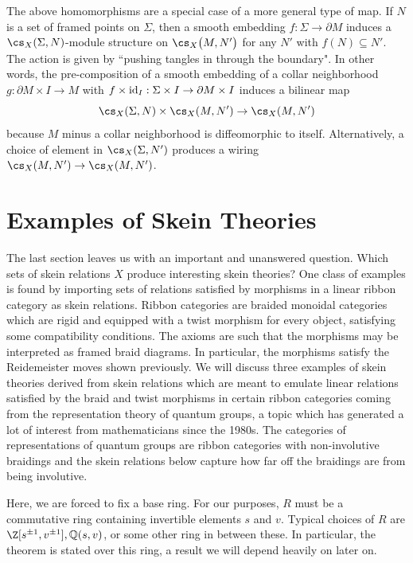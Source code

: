 \begin{remark} \label{rem:skeinaction}
The above homomorphisms are a special case of a more general type of map. If $N$ is a set of framed points on $\Sigma$, then a smooth embedding $f: \Sigma \to \partial M$ induces a $\cs_X(\Sigma, N)$-module structure on $\cs_X\big(M, N'\big)$ for any $N'$ with $f(N) \subseteq N'$. The action is given by ``pushing tangles in through the boundary". In other words, the pre-composition of a smooth embedding of a collar neighborhood $g: \partial M \times I \to M$ with $f \times {\rm{id}}_I: \Sigma\times I \to \partial M \times I$ induces a bilinear map
\[
\cs_X(\Sigma, N) \times \cs_X(M, N') \to \cs_X(M, N')
\]
because $M$ minus a collar neighborhood is diffeomorphic to itself. Alternatively, a choice of element in $\cs_X(\Sigma, N')$ produces a wiring $\cs_X(M, N') \to \cs_X(M, N')$.
\end{remark}


\section{Examples of Skein Theories} \label{sec:skeintheories}

The last section leaves us with an important and unanswered question. Which sets of skein relations $X$ produce interesting skein theories? One class of examples is found by importing sets of relations satisfied by morphisms in a linear ribbon category as skein relations. Ribbon categories are braided monoidal categories which are rigid and equipped with a twist morphism for every object, satisfying some compatibility conditions. The axioms are such that the morphisms may be interpreted as framed braid diagrams. In particular, the morphisms satisfy the Reidemeister moves shown previously. We will discuss three examples of skein theories derived from skein relations which are meant to emulate linear relations satisfied by the braid and twist morphisms in certain ribbon categories coming from the representation theory of quantum groups, a topic which has generated a lot of interest from mathematicians since the 1980s. The categories of representations of quantum groups are ribbon categories with non-involutive braidings and the skein relations below capture how far off the braidings are from being involutive.  

Here, we are forced to fix a base ring. For our purposes, $R$ must be a commutative ring containing invertible elements $s$ and $v$. Typical choices of $R$ are $\Z[s^{\pm 1}, v^{\pm 1}], \Q(s, v)$, or some other ring in between these.  In particular, the theorem  is stated over this ring, a result we will depend heavily on later on. \\

